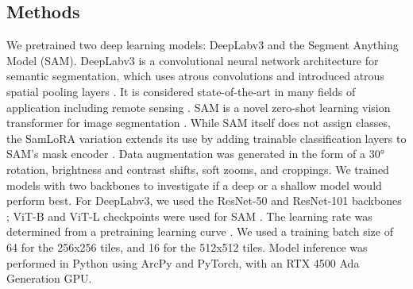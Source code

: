 \documentclass[lettersize,journal]{IEEEtran}
\begin{document}
\subsection{Methods}
We pretrained two deep learning models: DeepLabv3 and the Segment Anything Model (SAM). DeepLabv3 is a convolutional neural network architecture for semantic segmentation, which uses atrous convolutions 
and introduced atrous spatial pooling layers \cite{chenDeepLabSemanticImage2018}. It is considered state-of-the-art in many fields of application including remote sensing \cite{tuiaDeepLearningbasedSemantic2021}. 
SAM is a novel zero-shot learning vision transformer for image segmentation \cite{kirillovSegmentAnything2023}. While SAM itself does not assign classes, the SamLoRA variation extends its use by adding trainable 
classification layers to SAM's mask encoder \cite{esriFinetuneSegmentAnything2025}. Data augmentation was generated in the form of a 30° rotation, brightness and contrast shifts, soft zooms, and croppings. 
We trained models with two backbones to investigate if a deep or a shallow model would perform best. For DeepLabv3, we used the ResNet-50 and ResNet-101 backbones \cite{heDeepResidualLearning2015}; 
ViT-B and ViT-L checkpoints were used for SAM \cite{kirillovSegmentAnything2023}. The learning rate was determined from a pretraining learning curve \cite{smithCyclicalLearningRates2017,howardFastaiLayeredAPI2020}. 
We used a training batch size of 64 for the 256x256 tiles, and 16 for the 512x512 tiles. Model inference was performed in Python using ArcPy and PyTorch, with an RTX 4500 Ada Generation GPU.
\end{document}
